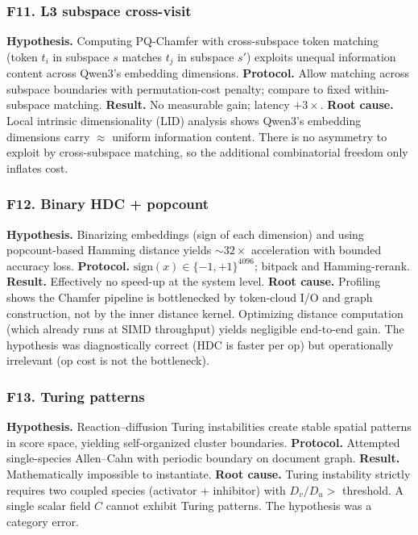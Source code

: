 \documentclass[review,1p,11pt]{elsarticle}
\begin{document}
\subsubsection*{F11. L3 subspace cross-visit}
\textbf{Hypothesis.} Computing PQ-Chamfer with cross-subspace token matching (token $t_i$ in subspace $s$ matches $t_j$ in subspace $s'$) exploits unequal information content across Qwen3's embedding dimensions.
\textbf{Protocol.} Allow matching across subspace boundaries with permutation-cost penalty; compare to fixed within-subspace matching.
\textbf{Result.} No measurable gain; latency $+3\times$.
\textbf{Root cause.} Local intrinsic dimensionality (LID) analysis shows Qwen3's embedding dimensions carry $\approx$ uniform information content. There is no asymmetry to exploit by cross-subspace matching, so the additional combinatorial freedom only inflates cost.

\subsubsection*{F12. Binary HDC + popcount}
\textbf{Hypothesis.} Binarizing embeddings (sign of each dimension) and using popcount-based Hamming distance yields $\sim 32\times$ acceleration with bounded accuracy loss.
\textbf{Protocol.} $\mathrm{sign}(x) \in \{-1, +1\}^{4096}$; bitpack and Hamming-rerank.
\textbf{Result.} Effectively no speed-up at the system level.
\textbf{Root cause.} Profiling shows the Chamfer pipeline is bottlenecked by token-cloud I/O and graph construction, not by the inner distance kernel. Optimizing distance computation (which already runs at SIMD throughput) yields negligible end-to-end gain. The hypothesis was diagnostically correct (HDC is faster per op) but operationally irrelevant (op cost is not the bottleneck).

\subsubsection*{F13. Turing patterns}
\textbf{Hypothesis.} Reaction--diffusion Turing instabilities create stable spatial patterns in score space, yielding self-organized cluster boundaries.
\textbf{Protocol.} Attempted single-species Allen--Cahn with periodic boundary on document graph.
\textbf{Result.} Mathematically impossible to instantiate.
\textbf{Root cause.} Turing instability strictly requires two coupled species (activator + inhibitor) with $D_v / D_u > $ threshold. A single scalar field $C$ cannot exhibit Turing patterns. The hypothesis was a category error.
\end{document}
